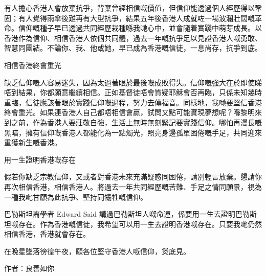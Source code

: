 有人擔心香港人會放棄抗爭，背棄曾經相信嘅價值，但信仰能透過個人經歷得以鞏固；有人覺得雨傘後難再有大型抗爭，結果五年後香港人成就咗一場波瀾壯闊嘅革命。信仰嘅種子早已透過共同經歷栽種喺我哋心中，並會隨着實踐中萌芽成長。以香港作為信仰、相信香港人依個共同體，過去一年嘅抗爭足以見證香港人嘅勇敢、智慧同團結。不論你、我、他或她，早已成為香港嘅信徒，一息尚存，抗爭到底。

相信香港終會重光

缺乏信仰嘅人容易迷失，因為太過著眼於最後嘅成敗得失。信仰嘅強大在於即使睇唔到結果，你都願意繼續相信。正如基督徒唔會質疑耶穌會否再臨，只係未知幾時重臨，信徒應該著眼於實踐信仰嘅過程，努力去傳福音。同樣地，我哋要堅信香港終會重光。如果連香港人自己都唔相信會贏，試問又點可能實現夢想呢？喺黎明來到之前，作為香港人要莊敬自強，生活上無時無刻緊記要實踐信仰。哪怕再漫長嘅黑暗，擁有信仰嘅香港人都能化為一點燭光，照亮身邊孤單困倦嘅手足，共同迎來重獲新生嘅香港。

用一生證明香港嘅存在

假若你缺乏宗教信仰，又或者對香港未來充滿疑惑同困倦，請別輕言放棄。懇請你再次相信香港，相信香港人。將過去一年共同經歷嘅苦難、手足之情同願景，視為一種我哋甘願為此抗爭、堅持同犧牲嘅信仰。

巴勒斯坦裔學者 Edward Said 講過巴勒斯坦人嘅命運，係要用一生去證明巴勒斯坦嘅存在。作為香港嘅信徒，我希望可以用一生去證明香港嘅存在。只要我哋仍然相信香港，香港就會存在。

在晚星墜落徬徨午夜，願各位堅守香港人嘅信仰，煲底見。

作者：良善如你

